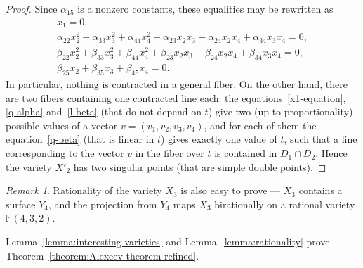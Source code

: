 \documentclass[12pt]{amsart}
\theoremstyle{definition}
\theoremstyle{remark}
\newtheorem{remark}[equation]{Remark}
\begin{document}
\begin{proof}
Since $\alpha_{15}$ is a nonzero constants, these equalities may be rewritten as
\begin{gather}
x_1=0,\label{x1-equation}\\
\alpha_{22}x_2^2+\alpha_{33}x_3^2+\alpha_{44}x_4^2+
\alpha_{23}x_2x_3+\alpha_{24}x_2x_4+\alpha_{34}x_3x_4=0,\label{q-alpha}\\
\beta_{22}x_2^2+\beta_{33}x_3^2+\beta_{44}x_4^2+
\beta_{23}x_2x_3+\beta_{24}x_2x_4+\beta_{34}x_3x_4=0,\label{q-beta}\\
\beta_{25}x_2+\beta_{35}x_3+\beta_{45}x_4=0.\label{l-beta}
\end{gather}
In particular, nothing is contracted in a general fiber. 
On the other hand, there are two fibers containing one contracted line each:
the equations~\ref{x1-equation}, \ref{q-alpha} 
and~\ref{l-beta} (that do not depend on $t$) give two (up to proportionality)
possible values of a vector $v=(v_1, v_2, v_3, v_4)$,
and for each of them the equation~\ref{q-beta} (that is linear in $t$) 
gives exactly one value of $t$, such that a line corresponding to the vector $v$
in the fiber over $t$ is contained in $D_1\cap D_2$. Hence the variety
$X'_2$ has two singular points (that are simple double points). 
\end{proof}

\begin{remark}
Rationality of the variety $X_3$ is also easy to prove --- $X_3$ contains
a surface $Y_4$, and the projection from $Y_4$ maps $X_3$ birationally on a 
rational variety ${\mathbb{F}}(4, 3, 2)$.
\end{remark}

Lemma~\ref{lemma:interesting-varieties} and Lemma~\ref{lemma:rationality}
prove Theorem~\ref{theorem:Alexeev-theorem-refined}.
\end{document}
